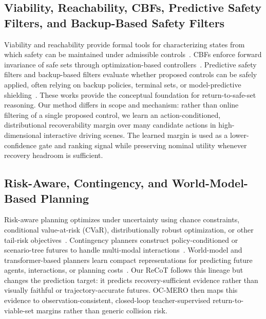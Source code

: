 \documentclass[conference]{IEEEtran}
\begin{document}
\subsection{Viability, Reachability, CBFs, Predictive Safety Filters, and Backup-Based Safety Filters}
Viability and reachability provide formal tools for characterizing states from which safety can be maintained under admissible controls~\cite{bansal2017hamilton,bansal2021deepreach,lin2023generating}. CBFs enforce forward invariance of safe sets through optimization-based controllers~\cite{ames2019control}. Predictive safety filters and backup-based filters evaluate whether proposed controls can be safely applied, often relying on backup policies, terminal sets, or model-predictive shielding~\cite{wabersich2021predictive,tearle2021predictive,koller2018learning,kim2026backup}. These works provide the conceptual foundation for return-to-safe-set reasoning. Our method differs in scope and mechanism: rather than online filtering of a single proposed control, we learn an action-conditioned, distributional recoverability margin over many candidate actions in high-dimensional interactive driving scenes. The learned margin is used as a lower-confidence gate and ranking signal while preserving nominal utility whenever recovery headroom is sufficient.

\subsection{Risk-Aware, Contingency, and World-Model-Based Planning}
Risk-aware planning optimizes under uncertainty using chance constraints, conditional value-at-risk (CVaR), distributionally robust optimization, or other tail-risk objectives~\cite{uryasev2000conditional,hakobyan2021wasserstein,safaoui2024distributionally,nair2024predictive}. Contingency planners construct policy-conditioned or scenario-tree futures to handle multi-modal interactions~\cite{li2023marc,mustafa2024racp}. World-model and transformer-based planners learn compact representations for predicting future agents, interactions, or planning costs~\cite{vaswani2017attention,ding2025understanding,hu2025survey}. Our ReCoT follows this lineage but changes the prediction target: it predicts recovery-sufficient evidence rather than visually faithful or trajectory-accurate futures. OC-MERO then maps this evidence to observation-consistent, closed-loop teacher-supervised return-to-viable-set margins rather than generic collision risk.
\end{document}
